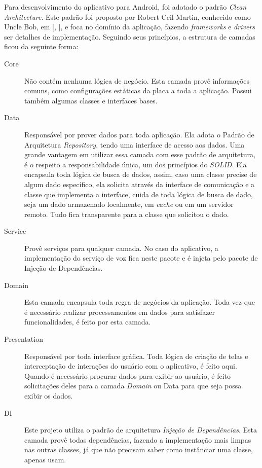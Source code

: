 \documentclass[
	12pt,				%
	oneside,			%
	a4paper,			%
	brazil				%
]{abntex2}
\newcommand{\citecustom}[1]{[\citeauthoronline{#1}, \citeyear{#1}]}
\begin{document}
{Para desenvolvimento do aplicativo para Android, foi adotado o padrão \textit{Clean Architecture}. Este padrão foi proposto por Robert Ceil Martin, conhecido como Uncle Bob, em \citecustom{martin2012clean}, e foca no domínio da aplicação, fazendo \textit{frameworks} e \textit{drivers} ser detalhes de implementação. Seguindo seus princípios, a estrutura de camadas ficou da seguinte forma:

\begin{description}

\item[Core] Não contém nenhuma lógica de negócio. Esta camada provê informações comuns, como configurações estáticas da placa a toda a aplicação. Possui também algumas classes e interfaces bases.

\item[Data] Responsável por prover dados para toda aplicação. Ela adota o Padrão de Arquitetura \textit{Repository}, tendo uma interface de acesso aos dados. Uma grande vantagem em utilizar essa camada com esse padrão de arquitetura, é o respeito a responsabilidade única, um dos princípios do \textit{SOLID}. Ela encapsula toda lógica de busca de dados, assim, caso uma classe precise de algum dado específico, ela solicita através da interface de comunicação e a classe que implementa a interface, cuida de toda lógica de busca de dado, seja um dado armazenado localmente, em \textit{cache} ou em um servidor remoto. Tudo fica transparente para a classe que solicitou o dado.

\item[Service] Provê serviços para qualquer camada. No caso do aplicativo, a implementação do serviço de voz fica neste pacote e é injeta pelo pacote de Injeção de Dependências.

\item[Domain] Esta camada encapsula toda regra de negócios da aplicação. Toda vez que é necessário realizar processamentos em dados para satisfazer funcionalidades, é feito por esta camada.

\item[Presentation] Responsável por toda interface gráfica. Toda lógica de criação de telas e interceptação de interações do usuário com o aplicativo, é feito aqui. Quando é necessário procurar dados para exibir ao usuário, é feito solicitações deles para a camada \textit{Domain} ou Data para que seja possa exibir os dados.

\item[DI] Este projeto utiliza o padrão de arquitetura \textit{Injeção de Dependências}. Esta camada provê todas dependências, fazendo a implementação mais limpas nas outras classes, já que não precisam saber como instânciar uma classe, apenas usam.
 

\end{description}}
\end{document}
